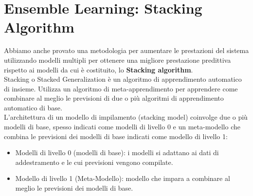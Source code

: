 \documentclass[../../Report.tex]{subfiles}
\begin{document}
    \section{Ensemble Learning: Stacking Algorithm}
    Abbiamo anche provato una metodologia per aumentare le prestazioni del sistema utilizzando modelli multipli per ottenere una migliore prestazione predittiva rispetto ai modelli da cui è costituito, lo \textbf{Stacking algorithm}.\\
    Stacking o Stacked Generalization è un algoritmo di apprendimento automatico di insieme. Utilizza un algoritmo di meta-apprendimento per apprendere come combinare al meglio le previsioni di due o più algoritmi di apprendimento automatico di base.\\
    L’architettura di un modello di impilamento (stacking model) coinvolge due o più modelli di base, spesso indicati come modelli di livello 0 e un meta-modello che combina le previsioni dei modelli di base indicati come modello di livello 1:
    \begin{itemize}
        \item Modelli di livello 0 (modelli di base): i modelli si adattano ai dati di addestramento e le cui previsioni vengono compilate.
        \item Modello di livello 1 (Meta-Modello): modello che impara a combinare al meglio le previsioni dei modelli di base.
    \end{itemize}
\end{document}
